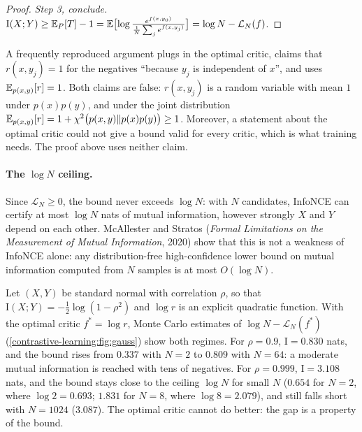\begin{notechapter}
\begin{proof}
\emph{Step 3, conclude.} $\mathrm I(X; Y)\geq\mathbb{E}_P[T] - 1 = \mathbb{E}\bigl[\log\frac{e^{f(x, y_0)}}{\frac1N\sum_je^{f(x, y_j)}}\bigr] = \log N - \mathcal L_N(f)$.
\end{proof}

\begin{pitfall}
A frequently reproduced argument plugs in the optimal critic, claims that $r(x, y_j) = 1$ for the
negatives ``because $y_j$ is independent of $x$'', and uses $\mathbb{E}_{p(x,y)}[r] = 1$. Both claims are false: $r(x, y_j)$ is a
random variable with mean $1$ under $p(x)p(y)$, and under the joint distribution
$\mathbb{E}_{p(x,y)}[r] = 1 + \chi^2\bigl(p(x, y)\Vert p(x)p(y)\bigr)\geq1$. Moreover, a statement about the optimal critic could not give a bound valid for
every critic, which is what training needs. The proof above uses neither claim.
\end{pitfall}

\paragraph{The $\log N$ ceiling.} Since $\mathcal L_N\geq0$, the bound never exceeds $\log N$: with $N$ candidates, InfoNCE can certify at
most $\log N$ nats of mutual information, however strongly $X$ and $Y$ depend on each other. McAllester
and Stratos (\emph{Formal Limitations on the Measurement of Mutual Information}, 2020) show that
this is not a weakness of InfoNCE alone: any distribution-free high-confidence lower bound on
mutual information computed from $N$ samples is at most $O(\log N)$.

\begin{example}\label{contrastive-learning:ex:gauss}
Let $(X, Y)$ be standard normal with correlation $\rho$, so that $\mathrm I(X; Y) = -\frac12\log(1 - \rho^2)$ and $\log r$ is an explicit
quadratic function. With the optimal critic $f^* = \log r$, Monte Carlo estimates of $\log N - \mathcal L_N(f^*)$ (\cref{contrastive-learning:fig:gauss})
show both regimes. For $\rho = 0.9$, $\mathrm I = 0.830$ nats, and the bound rises from $0.337$ with $N = 2$ to $0.809$ with $N = 64$: a
moderate mutual information is reached with tens of negatives. For $\rho = 0.999$, $\mathrm I = 3.108$ nats, and the bound
stays close to the ceiling $\log N$ for small $N$ ($0.654$ for $N = 2$, where $\log2 = 0.693$; $1.831$ for $N = 8$, where $\log8 = 2.079$),
and still falls short with $N = 1024$ ($3.087$). The optimal critic cannot do better: the gap is a
property of the bound.
\end{example}


\end{notechapter}
